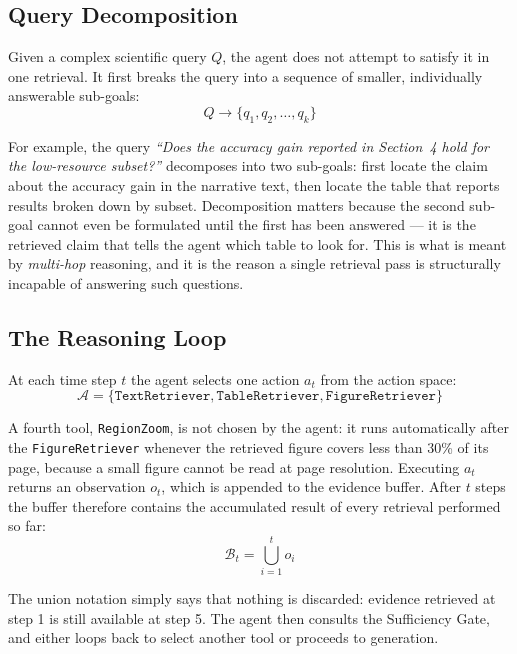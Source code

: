 \subsection{Query Decomposition}

Given a complex scientific query $Q$, the agent does not attempt to satisfy it in
one retrieval. It first breaks the query into a sequence of smaller, individually
answerable sub-goals:
\begin{equation}
    Q \longrightarrow \{q_1, q_2, \dots, q_k\}
\end{equation}

\noindent For example, the query \emph{``Does the accuracy gain reported in
Section~4 hold for the low-resource subset?''} decomposes into two sub-goals: first
locate the claim about the accuracy gain in the narrative text, then locate the
table that reports results broken down by subset. Decomposition matters because the
second sub-goal cannot even be formulated until the first has been answered --- it is
the retrieved claim that tells the agent which table to look for. This is what is
meant by \emph{multi-hop} reasoning, and it is the reason a single retrieval pass is
structurally incapable of answering such questions.

\subsection{The Reasoning Loop}

At each time step $t$ the agent selects one action $a_t$ from the action space:
\begin{equation}
    \mathcal{A} = \{\texttt{TextRetriever}, \texttt{TableRetriever}, \texttt{FigureRetriever}\}
\end{equation}

\noindent A fourth tool, \texttt{RegionZoom}, is not chosen by the agent: it runs
automatically after the \texttt{FigureRetriever} whenever the retrieved figure covers
less than 30\% of its page, because a small figure cannot be read at page resolution.
Executing $a_t$ returns an observation $o_t$, which is appended to the
evidence buffer. After $t$ steps the buffer therefore contains the accumulated
result of every retrieval performed so far:
\begin{equation}
    \mathcal{B}_t = \bigcup_{i=1}^{t} o_i
\end{equation}

\noindent The union notation simply says that nothing is discarded: evidence
retrieved at step 1 is still available at step 5. The agent then consults the
Sufficiency Gate, and either loops back to select another tool or proceeds to
generation.

